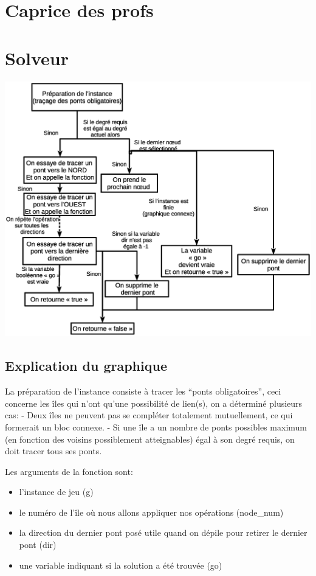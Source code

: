 \documentclass[12pt]{report}
\begin{document}
\chapter{Caprice des profs}

\chapter{Solveur}
\includegraphics[width = 1.00\textwidth]{explication_solveur.eps}
\section{Explication du graphique}
La préparation de l'instance consiste à tracer les ``ponts obligatoires'', ceci concerne les îles qui n'ont qu'une possibilité de lien(s),
on a déterminé plusieurs cas:\newline
- Deux îles ne peuvent pas se compléter totalement mutuellement, ce qui formerait un bloc connexe.\newline
- Si une île a un nombre de ponts possibles maximum (en fonction des voisins possiblement atteignables) égal à son degré requis, on doit tracer tous ses ponts.\newline

Les arguments de la fonction sont:
\begin{itemize}
\item l'instance de jeu (g)
\item le numéro de l'île où nous allons appliquer nos opérations (node\_num)
\item la direction du dernier pont posé utile quand on dépile pour retirer le dernier pont (dir)
\item une variable indiquant si la solution a été trouvée (go)
\end{itemize}
\end{document}
